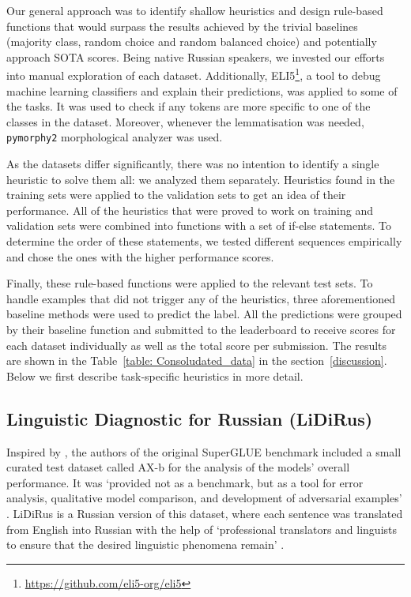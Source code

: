 \documentclass[11pt]{article}
\begin{document}
Our general approach was to identify shallow heuristics and design rule-based functions that would surpass the results achieved by the trivial baselines (majority class, random choice and random balanced choice) and potentially approach SOTA scores. Being native Russian speakers, we invested our efforts into manual exploration of each dataset. Additionally, ELI5\footnote{\url{https://github.com/eli5-org/eli5}}, a tool to debug machine learning classifiers and explain their predictions, was applied to some of the tasks. It was used to check if any tokens are more specific to one of the classes in the dataset. Moreover, whenever the lemmatisation was needed, \texttt{pymorphy2} morphological analyzer \cite{pymorphy2} was used.    

As the datasets differ significantly, there was no intention to identify a single heuristic to solve them all: we analyzed them separately. Heuristics found in the training sets were applied to the validation sets to get an idea of their performance. All of the heuristics that were proved to work on training and validation sets were combined into functions with a set of if-else statements. To determine the order of these statements, we tested different sequences empirically and chose the ones with the higher performance scores. 

Finally, these rule-based functions were applied to the relevant test sets. To handle examples that did not trigger any of the heuristics, three aforementioned baseline methods were used to predict the label. All the predictions were grouped by their baseline function and submitted to the leaderboard to receive scores for each dataset individually as well as the total score per submission. The results are shown in the Table~\ref{table: Consoludated_data} in the section~\ref{discussion}. Below we first describe task-specific heuristics in more detail.

\subsection{Linguistic Diagnostic for Russian (LiDiRus)}

Inspired by \cite{ettinger-etal-2017-towards}, the authors of the original SuperGLUE benchmark included a small curated test dataset called AX-b for the analysis of the models' overall performance. It was `provided not as a benchmark, but as a tool for error analysis, qualitative model comparison, and development of adversarial examples' \cite{wang-etal-2018-glue}.
LiDiRus is a Russian version of this dataset, where each sentence was translated from English into Russian with the help of `professional translators and linguists to ensure that the desired linguistic phenomena remain' \cite{shavrina-etal-2020-russiansuperglue}.
\end{document}
